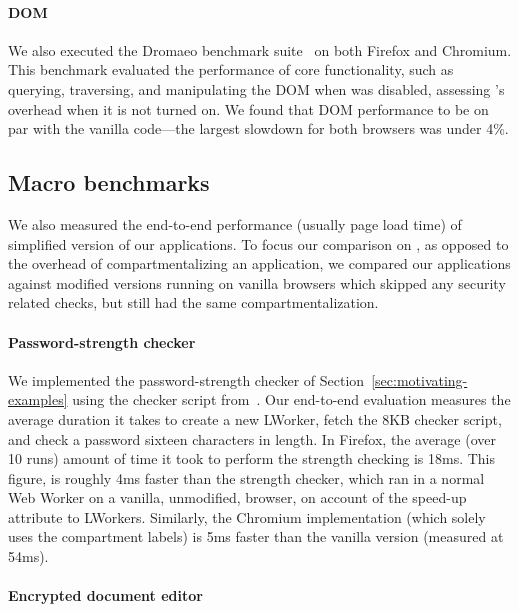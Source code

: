 \paragraph{DOM} We also executed the Dromaeo benchmark suite~\cite{dromaeo} on both
Firefox and Chromium.
%
This benchmark evaluated the performance of core functionality,
such as querying, traversing, and manipulating the DOM when
\sys{} was disabled, assessing \sys{}'s overhead when it is not
turned on.
%
We found that DOM performance to be on par with
the vanilla code---the largest slowdown for both browsers was under
4\%.

\subsection{Macro benchmarks}
\label{sec:eval:macro}

We also measured the end-to-end performance (usually page load time) of
simplified version of our applications.
%
To focus our comparison on \sys{}, as opposed to the overhead of
compartmentalizing an application, we compared our applications
against modified versions running on vanilla browsers which skipped any security
related checks, but still had the same compartmentalization.
%

\paragraph{Password-strength checker}
%
We implemented the password-strength checker of
Section~\ref{sec:motivating-examples} using the checker script
from~\cite{checker1}.
%
Our end-to-end evaluation measures the average duration it takes to
create a new LWorker, fetch the 8KB checker script, and check a password
sixteen characters in length.
%
In Firefox, the average (over 10 runs) amount of time it took to
perform the strength checking is 18ms.
%
This figure, is roughly 4ms faster than the strength checker,
which ran in a normal Web Worker on a vanilla, unmodified, browser,
on account of the speed-up attribute to LWorkers.
%
Similarly, the Chromium implementation (which solely uses the
compartment labels) is 5ms faster than the vanilla version (measured
at 54ms).
%


\paragraph{Encrypted document editor}

